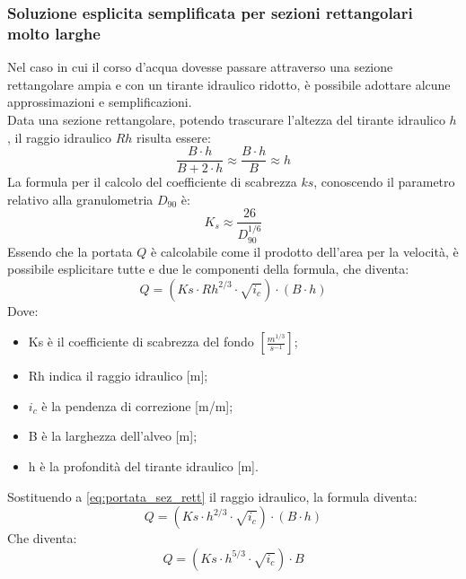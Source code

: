 \subsubsection{Soluzione esplicita semplificata per sezioni rettangolari molto larghe}
Nel caso in cui il corso d'acqua dovesse passare attraverso una sezione rettangolare ampia e con un tirante idraulico ridotto, è possibile adottare alcune approssimazioni e semplificazioni.\\
Data una sezione rettangolare, potendo trascurare l'altezza del tirante idraulico $h$, il raggio idraulico $Rh$ risulta essere:
\begin{equation}
    \frac{B \cdot h}{B + 2\cdot h} \approx \frac{B \cdot h}{B} \approx h
\end{equation}
La formula per il calcolo del coefficiente di scabrezza $ks$, conoscendo il parametro relativo alla granulometria $D_{90}$ è:
\begin{equation}
K_s \approx \frac{26}{D_{90}^{1/6}}
\end{equation}
Essendo che la portata $Q$ è calcolabile come il prodotto dell'area per la velocità, è possibile esplicitare tutte e due le componenti della formula, che diventa:
\begin{equation}
    Q = (Ks \cdot Rh^{2/3} \cdot \sqrt{i_c}) \cdot (B \cdot h)
    \label{eq:portata_sez_rett}
\end{equation}
Dove:
\begin{itemize}
    \item Ks è il coefficiente di scabrezza del fondo $\left[\frac{m^{1/3}}{s^{-1}}\right]$;
    \item Rh indica il raggio idraulico [\unit{m}];
    \item $i_c$ è la pendenza di correzione [\unit{m/m}];
    \item B è la larghezza dell'alveo [\unit{m}];
    \item h è la profondità del tirante idraulico [\unit{m}].
\end{itemize}
Sostituendo a \eqref{eq:portata_sez_rett} il raggio idraulico, la formula diventa:
\begin{equation}
    Q = (Ks \cdot h^{2/3} \cdot \sqrt{i_c}) \cdot (B \cdot h)
\end{equation}
Che diventa:
\begin{equation}
    Q = (Ks \cdot h^{5/3} \cdot \sqrt{i_c}) \cdot B
\end{equation}

